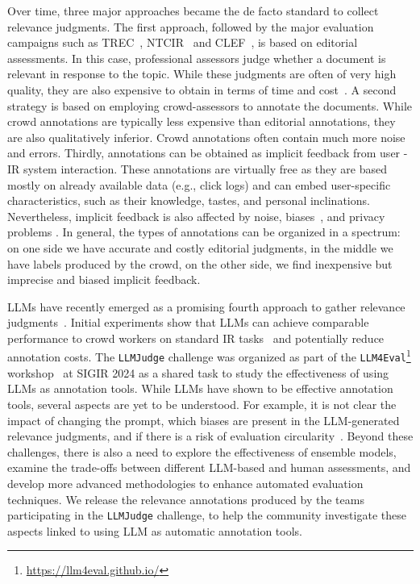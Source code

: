 Over time, three major approaches became the de facto standard to collect relevance judgments. The first approach, followed by the major evaluation campaigns such as TREC~\cite{DBLP:journals/ipm/Jones95}, NTCIR~\cite{kando1999overview} and CLEF~\cite{DBLP:conf/clef/2000}, is based on editorial assessments. In this case,  professional assessors judge whether a document is relevant in response to the topic. While these judgments are often of very high quality, they are also expensive to obtain in terms of time and cost~\cite{DBLP:journals/ftir/Sanderson10}.
A second strategy is based on employing crowd-assessors to annotate the documents. While crowd annotations are typically less expensive than editorial annotations, they are also qualitatively inferior. Crowd annotations often contain much more noise and errors.
Thirdly, annotations can be obtained as implicit feedback from user - \ac{IR} system interaction. These annotations are virtually free as they are based mostly on already available data (e.g., click logs) and can embed user-specific characteristics, such as their knowledge, tastes, and personal inclinations. Nevertheless, implicit feedback is also affected by noise, biases~\cite{JoachimsSwaminathanSchnabel2017}, and privacy problems \cite{DBLP:journals/tissec/AonghusaL16}.
In general, the types of annotations can be organized in a spectrum: on one side we have accurate and costly editorial judgments, in the middle we have labels produced by the crowd, on the other side, we find inexpensive but imprecise and biased implicit feedback.

\acp{LLM} have recently emerged as a promising fourth approach to gather relevance judgments~\cite{DBLP:conf/sigir/MacAvaneyS23,faggioli2023perspectives,thomas2023large,rahmani2024synthetic}. Initial experiments show that LLMs can achieve comparable performance to crowd workers on standard \ac{IR} tasks~\citep{DBLP:conf/sigir/BlancoHHMPTT11} and potentially reduce annotation costs. 
The \texttt{LLMJudge} challenge \cite{rahmani2024llmjudge} was organized as part of the \texttt{LLM4Eval}\footnote{\url{https://llm4eval.github.io/}} workshop~\cite{rahmani2024llm4eval} at SIGIR 2024 as a shared task to study the effectiveness of using \acp{LLM} as annotation tools.
While \acp{LLM} have shown to be effective annotation tools, several aspects are yet to be understood. For example, it is not clear the impact of changing the prompt, which biases are present in the \ac{LLM}-generated relevance judgments, and if there is a risk of evaluation circularity~\cite{faggioli2023perspectives}. Beyond these challenges, there is also a need to explore the effectiveness of ensemble models, examine the trade-offs between different LLM-based and human assessments, and develop more advanced methodologies to enhance automated evaluation techniques. We release the relevance annotations produced by the teams participating in the \texttt{LLMJudge} challenge, to help the community investigate these aspects linked to using \ac{LLM} as automatic annotation tools.

